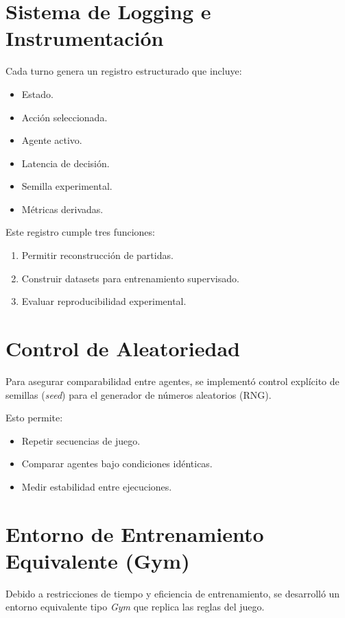 \section{Sistema de Logging e Instrumentación}

Cada turno genera un registro estructurado que incluye:

\begin{itemize}
    \item Estado.
    \item Acción seleccionada.
    \item Agente activo.
    \item Latencia de decisión.
    \item Semilla experimental.
    \item Métricas derivadas.
\end{itemize}

Este registro cumple tres funciones:

\begin{enumerate}
    \item Permitir reconstrucción de partidas.
    \item Construir datasets para entrenamiento supervisado.
    \item Evaluar reproducibilidad experimental.
\end{enumerate}

\section{Control de Aleatoriedad}

Para asegurar comparabilidad entre agentes, se implementó control explícito de semillas (\textit{seed}) para el generador de números aleatorios (RNG).

Esto permite:

\begin{itemize}
    \item Repetir secuencias de juego.
    \item Comparar agentes bajo condiciones idénticas.
    \item Medir estabilidad entre ejecuciones.
\end{itemize}

\section{Entorno de Entrenamiento Equivalente (Gym)}

Debido a restricciones de tiempo y eficiencia de entrenamiento, se desarrolló un entorno equivalente tipo \textit{Gym} que replica las reglas del juego.

